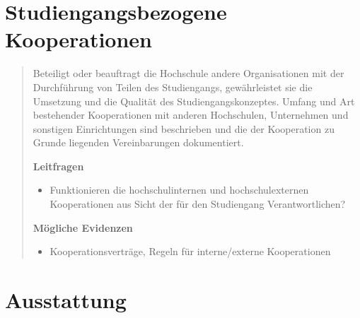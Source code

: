 \chapter{Studiengangsbezogene
Kooperationen}\label{studiengangsbezogene-kooperationen}

\begin{quote}
Beteiligt oder beauftragt die Hochschule andere Organisationen mit der
Durchführung von Teilen des Studiengangs, gewährleistet sie die
Umsetzung und die Qualität des Studiengangskonzeptes. Umfang und Art
bestehender Kooperationen mit anderen Hochschulen, Unternehmen und
sonstigen Einrichtungen sind beschrieben und die der Kooperation zu
Grunde liegenden Vereinbarungen dokumentiert.

\textbf{Leitfragen}

\begin{itemize}
\tightlist
\item
  Funktionieren die hochschulinternen und hochschulexternen
  Kooperationen aus Sicht der für den Studiengang Verantwortlichen?
\end{itemize}

\textbf{Mögliche Evidenzen}

\begin{itemize}
\tightlist
\item
  Kooperationsverträge, Regeln für interne/externe Kooperationen
\end{itemize}
\end{quote}

\chapter{Ausstattung}\label{ausstattung}

